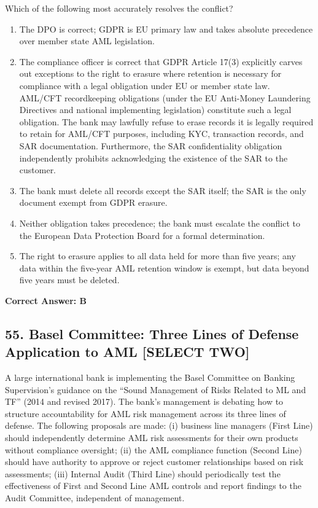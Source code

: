 \documentclass[11pt,a4paper]{article}
\begin{document}
	Which of the following most accurately resolves the conflict?
	
	\begin{enumerate}[label=\Alph*.]
		\item The DPO is correct; GDPR is EU primary law and takes absolute precedence over member state AML legislation.
		\item The compliance officer is correct that GDPR Article 17(3) explicitly carves out exceptions to the right to erasure where retention is necessary for compliance with a legal obligation under EU or member state law. AML/CFT recordkeeping obligations (under the EU Anti-Money Laundering Directives and national implementing legislation) constitute such a legal obligation. The bank may lawfully refuse to erase records it is legally required to retain for AML/CFT purposes, including KYC, transaction records, and SAR documentation. Furthermore, the SAR confidentiality obligation independently prohibits acknowledging the existence of the SAR to the customer.
		\item The bank must delete all records except the SAR itself; the SAR is the only document exempt from GDPR erasure.
		\item Neither obligation takes precedence; the bank must escalate the conflict to the European Data Protection Board for a formal determination.
		\item The right to erasure applies to all data held for more than five years; any data within the five-year AML retention window is exempt, but data beyond five years must be deleted.
	\end{enumerate}
	\textbf{Correct Answer: B}
	
	\subsection{55. Basel Committee: Three Lines of Defense Application to AML \textnormal{[SELECT TWO]}}
	
	A large international bank is implementing the Basel Committee on Banking Supervision's guidance on the ``Sound Management of Risks Related to ML and TF'' (2014 and revised 2017). The bank's management is debating how to structure accountability for AML risk management across its three lines of defense. The following proposals are made: (i) business line managers (First Line) should independently determine AML risk assessments for their own products without compliance oversight; (ii) the AML compliance function (Second Line) should have authority to approve or reject customer relationships based on risk assessments; (iii) Internal Audit (Third Line) should periodically test the effectiveness of First and Second Line AML controls and report findings to the Audit Committee, independent of management.
	
\end{document}
